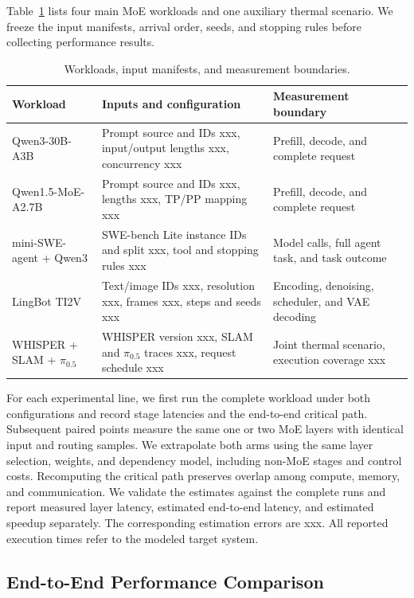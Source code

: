 \documentclass[conference,10pt]{IEEEtran}
\begin{document}
Table~\ref{tab:eval-workloads} lists four main MoE workloads and one auxiliary thermal scenario. We freeze the input manifests, arrival order, seeds, and stopping rules before collecting performance results.

\begin{table}[t]
\caption{Workloads, input manifests, and measurement boundaries.}
\label{tab:eval-workloads}
\centering\small
\begin{tabularx}{\textwidth}{@{}p{}Xp{}@{}}
\hline
Workload & Inputs and configuration & Measurement boundary \\
\hline
Qwen3-30B-A3B & Prompt source and IDs xxx, input/output lengths xxx, concurrency xxx & Prefill, decode, and complete request \\
Qwen1.5-MoE-A2.7B & Prompt source and IDs xxx, lengths xxx, TP/PP mapping xxx & Prefill, decode, and complete request \\
mini-SWE-agent + Qwen3 & SWE-bench Lite instance IDs and split xxx, tool and stopping rules xxx & Model calls, full agent task, and task outcome \\
LingBot TI2V & Text/image IDs xxx, resolution xxx, frames xxx, steps and seeds xxx & Encoding, denoising, scheduler, and VAE decoding \\
WHISPER + SLAM + $\pi_{0.5}$ & WHISPER version xxx, SLAM and $\pi_{0.5}$ traces xxx, request schedule xxx & Joint thermal scenario, execution coverage xxx \\
\hline
\end{tabularx}
\end{table}

For each experimental line, we first run the complete workload under both configurations and record stage latencies and the end-to-end critical path. Subsequent paired points measure the same one or two MoE layers with identical input and routing samples. We extrapolate both arms using the same layer selection, weights, and dependency model, including non-MoE stages and control costs. Recomputing the critical path preserves overlap among compute, memory, and communication. We validate the estimates against the complete runs and report measured layer latency, estimated end-to-end latency, and estimated speedup separately. The corresponding estimation errors are xxx. All reported execution times refer to the modeled target system.

\subsection{End-to-End Performance Comparison}
\end{document}
